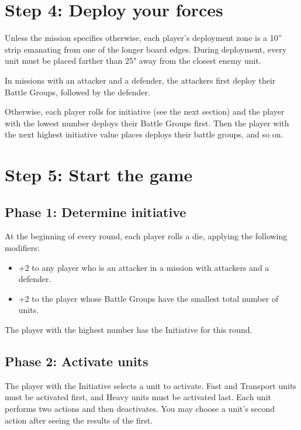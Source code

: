 \begin{multicols}{2}
\section*{Step 4: Deploy your forces}
Unless the mission specifies otherwise, each player's deployment zone is a 10'' strip emanating from one of the longer board edges. During deployment, every unit must be placed farther than 25" away from the closest enemy unit.

In missions with an attacker and a defender, the attackers first deploy their Battle Groups, followed by the defender.

Otherwise, each player rolls for initiative (see the next section) and the player with the lowest number deploys their Battle Groups first. Then the player with the next highest initiative value places deploys their battle groups, and so on.




\section*{Step 5: Start the game}

\subsection*{Phase 1: Determine initiative}

At the beginning of every round, each player rolls a die, applying the following modifiers:
\begin{itemize}
    \item +2 to any player who is an attacker in a mission with attackers and a defender.
    \item +2 to the player whose Battle Groups have the smallest total number of units.
\end{itemize}

The player with the highest number has the Initiative for this round.


\subsection*{Phase 2: Activate units}

The player with the Initiative selects a unit to activate. Fast and Transport units must be activated first, and Heavy units must be activated last. Each unit performs two actions and then deactivates. You may choose a unit's second action after seeing the results of the first.


\end{multicols}
